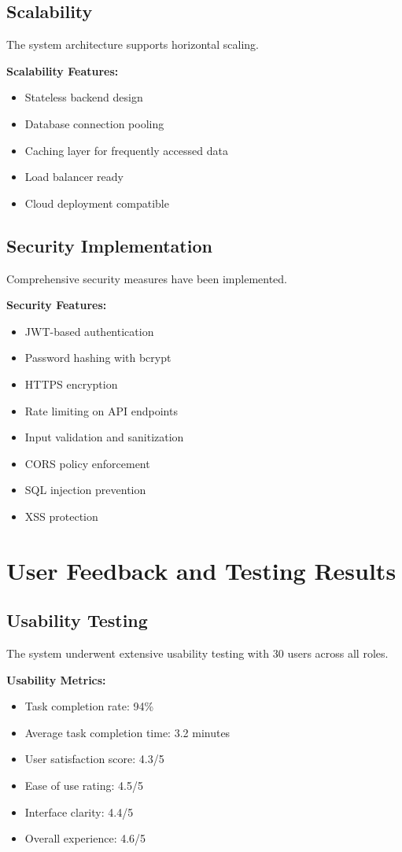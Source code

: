 \subsection{Scalability}
The system architecture supports horizontal scaling.

\textbf{Scalability Features:}
\begin{itemize}
    \item Stateless backend design
    \item Database connection pooling
    \item Caching layer for frequently accessed data
    \item Load balancer ready
    \item Cloud deployment compatible
\end{itemize}

\subsection{Security Implementation}
Comprehensive security measures have been implemented.

\textbf{Security Features:}
\begin{itemize}
    \item JWT-based authentication
    \item Password hashing with bcrypt
    \item HTTPS encryption
    \item Rate limiting on API endpoints
    \item Input validation and sanitization
    \item CORS policy enforcement
    \item SQL injection prevention
    \item XSS protection
\end{itemize}

\section{User Feedback and Testing Results}

\subsection{Usability Testing}
The system underwent extensive usability testing with 30 users across all roles.

\textbf{Usability Metrics:}
\begin{itemize}
    \item Task completion rate: 94\%
    \item Average task completion time: 3.2 minutes
    \item User satisfaction score: 4.3/5
    \item Ease of use rating: 4.5/5
    \item Interface clarity: 4.4/5
    \item Overall experience: 4.6/5
\end{itemize}

